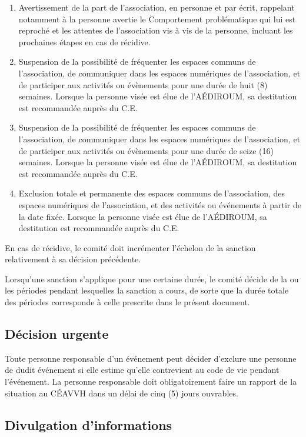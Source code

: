 \documentclass{aediroum}
\begin{document}
\begin{enumerate}
    \item Avertissement de la part de l’association, en personne et par écrit, rappelant notamment à la personne avertie le Comportement problématique qui lui est reproché et les attentes de l’association vis à vis de la personne, incluant les prochaines étapes en cas de récidive.
    \item Suspension de la possibilité de fréquenter les espaces communs de l’association, de communiquer dans les espaces numériques de l’association, et de participer aux activités ou évènements pour une durée de huit (8) semaines. Lorsque la personne visée est élue de l’AÉDIROUM, sa destitution est recommandée auprès du C.E.
    \item Suspension de la possibilité de fréquenter les espaces communs de l’association, de communiquer dans les espaces numériques de l’association, et de participer aux activités ou évènements pour une durée de seize (16) semaines. Lorsque la personne visée est élue de l’AÉDIROUM, sa destitution est recommandée auprès du C.E.
    \item Exclusion totale et permanente des espaces communs de l’association, des espaces numériques de l’association, et des activités ou événements à partir de la date fixée. Lorsque la personne visée est élue de l’AÉDIROUM, sa destitution est recommandée auprès du C.E.
\end{enumerate}

En cas de récidive, le comité doit incrémenter l’échelon de la sanction relativement à sa décision précédente.

Lorsqu’une sanction s’applique pour une certaine durée, le comité décide de la ou les périodes pendant lesquelles la sanction a cours, de sorte que la durée totale des périodes corresponde à celle prescrite dans le présent document.

\subsection{Décision urgente}

Toute personne responsable d’un événement peut décider d’exclure une personne de dudit événement si elle estime qu’elle contrevient au code de vie pendant l’événement. La personne responsable doit obligatoirement faire un rapport de la situation au CÉAVVH dans un délai de cinq (5) jours ouvrables.

\subsection{Divulgation d’informations}
\end{document}
